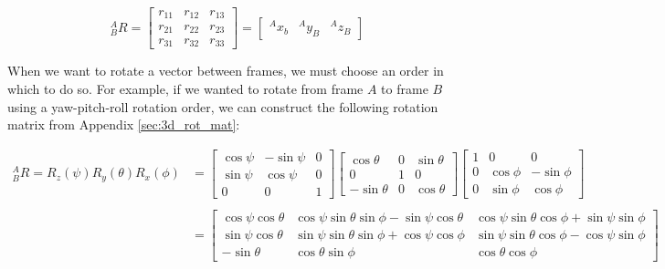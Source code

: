 \begin{equation*}
    {}^A_B R = \left[
        \begin{matrix}
            r_{11} & r_{12} & r_{13} \\
            r_{21} & r_{22} & r_{23} \\
            r_{31} & r_{32} & r_{33}
        \end{matrix}
    \right] = \left[
        \begin{matrix}
            {}^Ax_b & {}^Ay_B & {}^Az_B
        \end{matrix}\right]
\end{equation*}

When we want to rotate a vector between frames, we must choose an order in which to do so.
For example, if we wanted to rotate from frame $A$ to frame $B$ using a yaw-pitch-roll rotation order, we can construct the following rotation matrix from Appendix \ref{sec:3d_rot_mat}:

\begin{align*}
    {}^A_B R = R_z(\psi) R_y(\theta) R_x(\phi) &= \left[
        \begin{matrix}
            \cos\psi & -\sin\psi & 0 \\
            \sin\psi & \cos\psi & 0 \\
            0 & 0 & 1
        \end{matrix}\right]
        \left[\begin{matrix}
            \cos\theta & 0 & \sin\theta \\
            0 & 1 & 0 \\
            -\sin\theta & 0 & \cos\theta
        \end{matrix}\right]
        \left[\begin{matrix}
            1 & 0 & 0 \\
            0 & \cos\phi & -\sin\phi \\
            0 & \sin\phi & \cos\phi 
        \end{matrix}\right] \\ \\
        &= \left[\begin{matrix}
            \cos\psi\cos\theta & \cos\psi\sin\theta\sin\phi-\sin\psi\cos\theta & \cos\psi\sin\theta\cos\phi+\sin\psi\sin\phi \\
            \sin\psi\cos\theta & \sin\psi\sin\theta\sin\phi+\cos\psi\cos\phi & \sin\psi\sin\theta\cos\phi-\cos\psi\sin\phi \\
            -\sin\theta & \cos\theta\sin\phi & \cos\theta\cos\phi
        \end{matrix}\right]
\end{align*}

